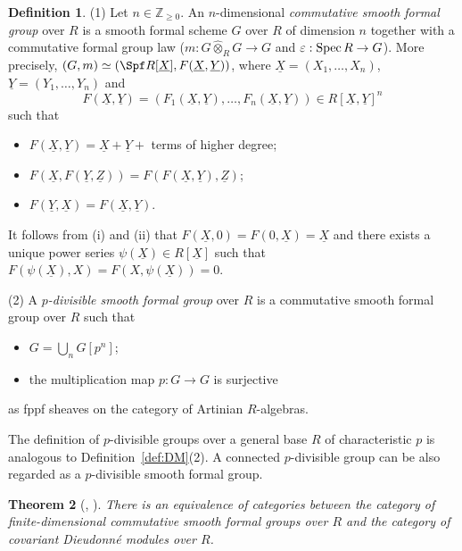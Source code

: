 \documentclass[]{amsart}
\theoremstyle{plain}
\newtheorem{thm}{Theorem}
\theoremstyle{definition}
\newtheorem{defn}[thm]{Definition}
\theoremstyle{remark}
\def\Spec{{\rm Spec}\,}
\newcommand{\Z}{\mathbb Z}
\newcommand{\<}{\langle}   %
\renewcommand{\>}{\rangle} %
\newcommand{\dieu}{Dieudonn\'{e} }
\def\ul{\underline}
\def\wh{\widehat}
\begin{document}
\begin{defn}
    {\rm (1)} Let $n\in \Z_{\ge 0}$. An $n$-dimensional \emph{commutative smooth formal group} over $R$ is a smooth formal scheme $G$ over $R$ of dimension $n$ together with a commutative formal group law ($m:G\wh\otimes_R G\to G$ and $\varepsilon: \Spec R \to G$). More precisely, $(G,m)\simeq (\Spf R[\ul X], F(\ul X,\ul Y))$, where $\ul X=(X_1,\dots , X_n)$, $\ul Y=(Y_1,\dots , Y_n)$ and 
    \[ F(\ul X,\ul Y)=(F_1(\ul X, \ul Y), \dots, F_n(\ul X,\ul Y))\in R[\ul X,\ul Y]^n \] 
    such that 
    \begin{itemize}
        \item [(i)] $F(\ul X,\ul Y)=\ul X+\ul Y +$ terms of higher degree;
        \item [(ii)] $F(\ul X, F(\ul Y,\ul Z))=F(F(\ul X, \ul Y), \ul Z)$;
        \item[(iii)] $F(\ul Y,\ul X)=F(\ul X, \ul Y)$. 
    \end{itemize}
    It follows from (i) and (ii) that $F(\ul X,0)=F(0,\ul X)=\ul X$ and there exists a unique power series $\psi(\ul X)\in R[\ul X]$ such that $F(\psi(\ul X), X)=F(X,\psi(\ul X))=0$.

    {\rm (2)} A \emph{$p$-divisible smooth formal group} over $R$ is a commutative smooth formal group over $R$ such that 
    \begin{itemize}
        \item [(i)] $G=\bigcup_n G[p^n]$;
        \item [(ii)] the multiplication map $p:G\to G$ is surjective  
    \end{itemize}
    as fppf sheaves on the category of Artinian $R$-algebras.
\end{defn}
The definition of $p$-divisible groups over a general base $R$ of characteristic $p$ is analogous to Definition~\ref{def:DM}(2). A connected $p$-divisible group can be also regarded as a $p$-divisible smooth formal group.







\begin{thm}[{\cite{zink:cartier}, \cite[Theorem 3.3]{chai:cartier}}]\label{thm:cartier} 
   There is an equivalence of categories between the category of finite-dimensional commutative smooth formal groups over $R$ and the category of
covariant \dieu modules over $R$.  
\end{thm}
\end{document}
